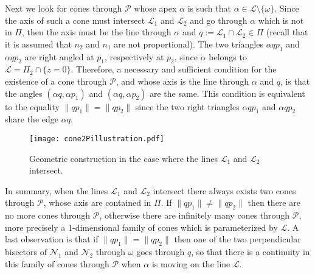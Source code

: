 \documentclass[5p]{elsarticle}
\newcommand\Pc{\mathcal P}
\def\Lc{{\mathcal{L}}}
\def\Nc{{\mathcal{N}}}
\newcommand{\com}[1]{{\color{black} #1}}
\newcommand{\lb}[1]{{\color{black} #1}}
\begin{document}
\lb{Next we look} for cones through $\Pc$ \lb{whose} apex $\alpha$ is such that $\alpha \in \Lc \setminus \{\omega\}$.  Since the axis of such a cone must intersect $\Lc_1$ and $\Lc_2$ and go through $\alpha$ which is not in $\Pi$, then \com{the axis} must be the line through $\alpha$ and $q:=\Lc_1\cap \Lc_2 \in \Pi$ (recall that it is assumed that $n_2$ and $n_1$ are not proportional). 
\com{The two triangles $\alpha q p_1$ and $\alpha q p_2$ are right angled at $p_1$, respectively at $p_2$, since $\alpha$ belongs to $\Lc=\Pi_2\cap\{z=0\}$. Therefore, a necessary and sufficient condition for the existence of a cone through $\Pc$, and whose axis is the line through $\alpha$ and $q$, is that the angles $(\alpha q, \alpha p_1)$ and $(\alpha q, \alpha p_2)$ are the same. This condition is equivalent to the equality $\|qp_1\|=\|qp_2\|$ since the two right triangles $\alpha q p_1$ and $\alpha q p_2$ share the edge $\alpha q$.
}



 \begin{figure}
	\hspace{-1.5em}
	\texttt{[image: cone2Pillustration.pdf]}
    \caption{Geometric construction in the case where the lines $\Lc_1$ and $\Lc_2$ intersect.}\label{fig:schema}
 \end{figure}

In summary, when the lines $\Lc_1$ and $\Lc_2$ intersect there always exists two cones through $\Pc$, whose axis are contained in $\Pi$. If $\|qp_1\|\neq \|qp_2\|$ then there are no more cones through $\Pc$, otherwise there are infinitely many cones through $\Pc$, more precisely a 1-dimensional family of cones which is parameterized by $\Lc$. A last observation is that if $\|qp_1\|=\|qp_2\|$ then \com{one of the two} perpendicular bisectors of $\Nc_1$ and $\Nc_2$ through $\omega$ goes through $q$, so that there is a continuity in this family of cones through $\Pc$ when $\alpha$ is moving on the line $\Lc$.
\end{document}
